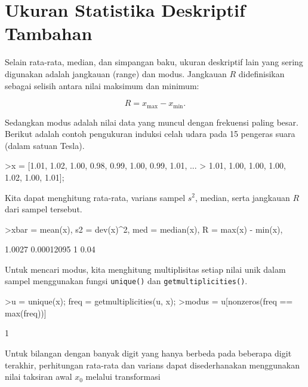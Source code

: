 \documentclass[a4paper,11pt,oneside,enabledeprecatedfontcommands]{scrbook}
\newenvironment{eulernotebook}{}{}
\newcommand{\eulerheading}[1]{\chapter{#1}}
\newenvironment{eulercomment}{\par\medskip\noindent}{\par\medskip}
\newenvironment{eulerformula}{}{}
\begin{document}
\begin{eulernotebook}
		\eulerheading{Ukuran Statistika Deskriptif Tambahan}
		\begin{eulercomment}
			Selain rata-rata, median, dan simpangan baku, ukuran deskriptif lain yang sering digunakan adalah
			jangkauan (range) dan modus. Jangkauan $R$ didefinisikan sebagai selisih antara nilai maksimum dan
			minimum:
		\end{eulercomment}
		\begin{eulerformula}
			\[
			R = x_{\max} - x_{\min}.
			\]
		\end{eulerformula}
		\begin{eulercomment}
			Sedangkan modus adalah nilai data yang muncul dengan frekuensi paling besar. Berikut adalah contoh
			pengukuran induksi celah udara pada 15 pengeras suara (dalam satuan Tesla).
		\end{eulercomment}
		\begin{eulerprompt}
			>x = [1.01, 1.02, 1.00, 0.98, 0.99, 1.00, 0.99, 1.01, ...
			>     1.01, 1.00, 1.00, 1.00, 1.02, 1.00, 1.01];
		\end{eulerprompt}
		\begin{eulercomment}
			Kita dapat menghitung rata-rata, varians sampel $s^2$, median, serta jangkauan $R$ dari sampel tersebut.
		\end{eulercomment}
		\begin{eulerprompt}
			>xbar = mean(x), s2 = dev(x)^2, med = median(x), R = max(x) - min(x),
		\end{eulerprompt}
		\begin{euleroutput}
			1.0027
			0.00012095
			1
			0.04
		\end{euleroutput}
		\begin{eulercomment}
			Untuk mencari modus, kita menghitung multiplisitas setiap nilai unik dalam sampel menggunakan fungsi
			\texttt{unique()} dan \texttt{getmultiplicities()}.
		\end{eulercomment}
		\begin{eulerprompt}
			>u = unique(x); freq = getmultiplicities(u, x);
			>modus = u[nonzeros(freq == max(freq))]
		\end{eulerprompt}
		\begin{euleroutput}
			1
		\end{euleroutput}
		\begin{eulercomment}
			Untuk bilangan dengan banyak digit yang hanya berbeda pada beberapa digit terakhir, perhitungan
			rata-rata dan varians dapat disederhanakan menggunakan nilai taksiran awal $x_0$ melalui transformasi
		\end{eulercomment}

\end{eulernotebook}
\end{document}
